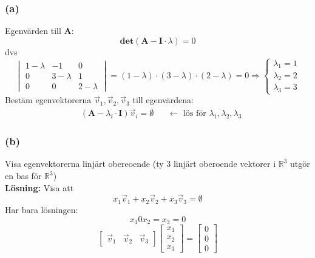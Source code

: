 \subsubsection{(a)}
Egenvärden till \textbf{A}:
\[
    \mathbf{det}(\mathbf{A} - \mathbf{I} \cdot \lambda) = 0
\]
dvs
\[
    \begin{vmatrix}
        1 - \lambda & -1 & 0\\
        0 & 3 - \lambda & 1\\
        0 & 0 & 2 - \lambda
    \end{vmatrix}
    = (1 - \lambda) \cdot (3 - \lambda) \cdot (2 - \lambda) = 0 \Rightarrow
    \begin{cases}
        \lambda_1 = 1\\
        \lambda_2 = 2\\
        \lambda_3 = 3
    \end{cases}
\]
Bestäm egenvektorerna $\vec{v}_1, \vec{v}_2, \vec{v}_3$ till egenvärdena:
\begin{align*}
&(\mathbf{A} - \lambda_i \cdot \mathbf{I}) \vec{v}_i = \emptyset
&& \leftarrow \mbox{ lös för $\lambda_1, \lambda_2, \lambda_3$}
\end{align*}
\subsubsection{(b)}
Visa egenvektorerna linjärt obereoende (ty 3 linjärt oberoende vektorer i $\mathbb{R}^3$ utgör en bas för $\mathbb{R}^3$)\\
\textbf{Lösning:} Visa att
\[
    x_1 \vec{v}_1 + x_2 \vec{v}_2 + x_3 \vec{v}_3 = \emptyset
\]
Har bara lösningen:
\[
    x_1 0 x_2 = x_3 = 0
\]
\[
    \begin{bmatrix} \vec{v}_1 & \vec{v}_2 & \vec{v}_3 \end{bmatrix}
    \begin{bmatrix} x_1\\x_2\\x_3 \end{bmatrix} =
    \begin{bmatrix} 0\\0\\0 \end{bmatrix}
\]

